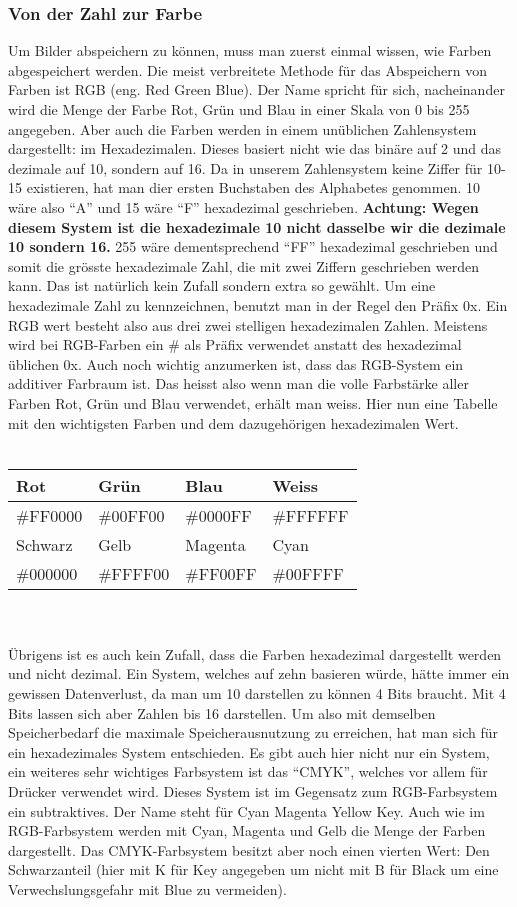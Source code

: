 \subsubsection{Von der Zahl zur Farbe}
Um Bilder abspeichern zu können, muss man zuerst einmal wissen, wie Farben abgespeichert werden. Die meist verbreitete Methode für das Abspeichern von Farben ist RGB (eng. Red Green Blue). Der Name spricht für sich, nacheinander wird die Menge der Farbe Rot, Grün und Blau in einer Skala von 0 bis 255 angegeben. Aber auch die Farben werden in einem unüblichen Zahlensystem dargestellt: im Hexadezimalen. Dieses basiert nicht wie das binäre auf 2 und das dezimale auf 10, sondern auf 16. Da in unserem Zahlensystem keine Ziffer für 10-15 existieren, hat man dier ersten Buchstaben des Alphabetes genommen. 10 wäre also "`A"' und 15 wäre "`F"' hexadezimal geschrieben. \textbf{Achtung: Wegen diesem System ist die hexadezimale 10 nicht dasselbe wir die dezimale 10 sondern 16.} 255 wäre dementsprechend "`FF"' hexadezimal geschrieben und somit die grösste hexadezimale Zahl, die mit zwei Ziffern geschrieben werden kann. Das ist natürlich kein Zufall sondern extra so gewählt. Um eine hexadezimale Zahl zu kennzeichnen, benutzt man in der Regel den Präfix 0x. Ein RGB wert besteht also aus drei zwei stelligen hexadezimalen Zahlen. Meistens wird bei RGB-Farben ein \# als Präfix verwendet anstatt des hexadezimal üblichen 0x. Auch noch wichtig anzumerken ist, dass das RGB-System ein additiver Farbraum ist. Das heisst also wenn man die volle Farbstärke aller Farben Rot, Grün und Blau verwendet, erhält man weiss. Hier nun eine Tabelle mit den wichtigsten Farben und dem dazugehörigen hexadezimalen Wert. \\
\\
\begin{tabular}{|l|l|l|l|}
\hline
Rot & Grün & Blau & Weiss \\ \hline
\#FF0000  & \#00FF00 & \#0000FF & \#FFFFFF \\ \hline
Schwarz & Gelb & Magenta & Cyan \\ \hline
\#000000 & \#FFFF00 & \#FF00FF & \#00FFFF \\ \hline
\end{tabular} \\
\\
Übrigens ist es auch kein Zufall, dass die Farben hexadezimal dargestellt werden und nicht dezimal. Ein System, welches auf zehn basieren würde, hätte immer ein gewissen Datenverlust, da man um 10 darstellen zu können 4 Bits braucht. Mit 4 Bits lassen sich aber Zahlen bis 16 darstellen. Um also mit demselben Speicherbedarf die maximale Speicherausnutzung zu erreichen, hat man sich für ein hexadezimales System entschieden. Es gibt auch hier nicht nur ein System, ein weiteres sehr wichtiges Farbsystem ist das "`CMYK"', welches vor allem für Drücker verwendet wird. Dieses System ist im Gegensatz zum RGB-Farbsystem ein subtraktives. Der Name steht für Cyan Magenta Yellow Key. Auch wie im RGB-Farbsystem werden mit Cyan, Magenta und Gelb die Menge der Farben dargestellt. Das CMYK-Farbsystem besitzt aber noch einen vierten Wert: Den Schwarzanteil (hier mit K für Key angegeben um nicht mit B für Black um eine Verwechslungsgefahr mit Blue zu vermeiden).
